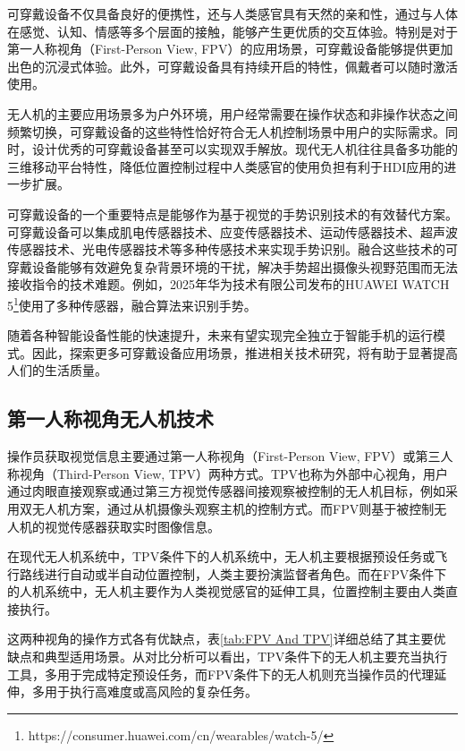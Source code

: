 可穿戴设备不仅具备良好的便携性，还与人类感官具有天然的亲和性，通过与人体在感觉、认知、情感等多个层面的接触，能够产生更优质的交互体验。特别是对于第一人称视角（First-Person View, FPV）的应用场景，可穿戴设备能够提供更加出色的沉浸式体验。此外，可穿戴设备具有持续开启的特性，佩戴者可以随时激活使用\cites{motti2020wearable}。

无人机的主要应用场景多为户外环境，用户经常需要在操作状态和非操作状态之间频繁切换，可穿戴设备的这些特性恰好符合无人机控制场景中用户的实际需求。同时，设计优秀的可穿戴设备甚至可以实现双手解放。现代无人机往往具备多功能的三维移动平台特性，降低位置控制过程中人类感官的使用负担有利于HDI应用的进一步扩展。

可穿戴设备的一个重要特点是能够作为基于视觉的手势识别技术的有效替代方案。可穿戴设备可以集成肌电传感器技术、应变传感器技术、运动传感器技术、超声波传感器技术、光电传感器技术等多种传感技术来实现手势识别。融合这些技术的可穿戴设备能够有效避免复杂背景环境的干扰，解决手势超出摄像头视野范围而无法接收指令的技术难题。例如，2025年华为技术有限公司发布的HUAWEI WATCH 5\footnote{https://consumer.huawei.com/cn/wearables/watch-5/}使用了多种传感器，融合算法来识别手势。

随着各种智能设备性能的快速提升，未来有望实现完全独立于智能手机的运行模式。因此，探索更多可穿戴设备应用场景，推进相关技术研究，将有助于显著提高人们的生活质量。

\subsection{第一人称视角无人机技术}

操作员获取视觉信息主要通过第一人称视角（First-Person View, FPV）或第三人称视角（Third-Person View, TPV）两种方式。TPV也称为外部中心视角，用户通过肉眼直接观察或通过第三方视觉传感器间接观察被控制的无人机目标，例如采用双无人机方案，通过从机摄像头观察主机的控制方式\cites{inoue2023birdviewar}。而FPV则基于被控制无人机的视觉传感器获取实时图像信息。

在现代无人机系统中，TPV条件下的人机系统中，无人机主要根据预设任务或飞行路线进行自动或半自动位置控制，人类主要扮演监督者角色。而在FPV条件下的人机系统中，无人机主要作为人类视觉感官的延伸工具，位置控制主要由人类直接执行。

这两种视角的操作方式各有优缺点，表\ref{tab:FPV And TPV}详细总结了其主要优缺点和典型适用场景。从对比分析可以看出，TPV条件下的无人机主要充当执行工具，多用于完成特定预设任务，而FPV条件下的无人机则充当操作员的代理延伸，多用于执行高难度或高风险的复杂任务。

